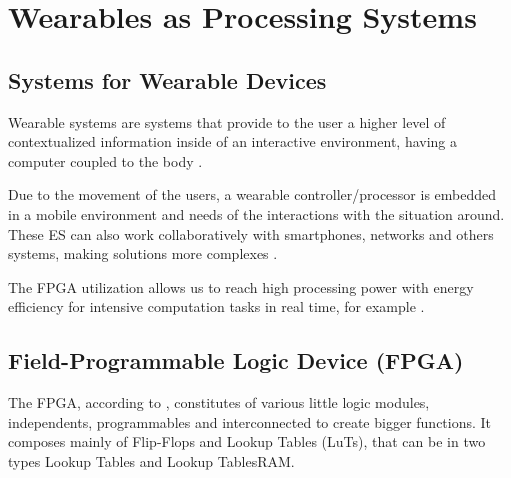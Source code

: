 \section{Wearables as Processing Systems} \label{chap:revisao_bibliografica}
   \subsection{Systems for Wearable Devices}
      
      Wearable systems are systems that provide to the user a higher level of contextualized information inside of an interactive environment, having a computer coupled to the body \cite{Amorim2017}.

      Due to the movement of the users, a wearable controller/processor is embedded in a mobile environment and needs of the interactions with the situation around.
      These ES can also work collaboratively with smartphones, networks and others systems, making solutions more complexes \cite{Jozwiak2017}.
      

      The FPGA utilization allows us to reach high processing power with energy efficiency for intensive computation tasks in real time, for example \cite{Plessl2003}.


   \subsection{Field-Programmable Logic Device (FPGA)}

      The FPGA, according to \cite{tocci2003sistemas}, constitutes of various little logic modules, independents, programmables and interconnected to create bigger functions.
      It composes mainly of Flip-Flops and Lookup Tables (LuTs), that can be in two types Lookup Tables and Lookup TablesRAM.
      
